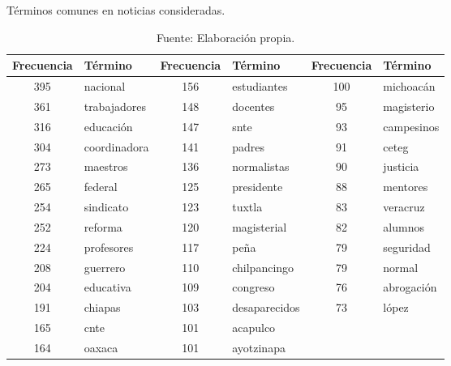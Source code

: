 \documentclass[letterpaper, 11pt]{book}
\theoremstyle{definition}
\theoremstyle{remark}
\begin{document}
\begin{table}[!hbt]
\center
\footnotesize
\caption{Términos comunes en noticias consideradas.}
\label{TerminosComunesNoticias}
\begin{tabular}{ | c | l || c | l || c | l | } 
\hline
\textbf{Frecuencia} & \textbf{Término} & \textbf{Frecuencia} & \textbf{Término} & \textbf{Frecuencia} & \textbf{Término} \\
\hline
395 &  nacional & 156 &  estudiantes & 100 &  michoacán\\ \hline
361 &  trabajadores & 148 &  docentes & 95 &  magisterio\\ \hline
316 &  educación & 147 &  snte & 93 &  campesinos\\ \hline
304 &  coordinadora & 141 &  padres & 91 &  ceteg\\ \hline
273 &  maestros & 136 &  normalistas & 90 &  justicia\\ \hline
265 &  federal & 125 &  presidente & 88 &  mentores\\ \hline
254 &  sindicato & 123 &  tuxtla & 83 &  veracruz\\ \hline
252 &  reforma & 120 &  magisterial & 82 &  alumnos\\ \hline
224 &  profesores & 117 &  peña & 79 &  seguridad\\ \hline
208 &  guerrero & 110 &  chilpancingo & 79 &  normal\\ \hline
204 &  educativa & 109 &  congreso & 76 &  abrogación\\ \hline
191 &  chiapas & 103 &  desaparecidos & 73 &  lópez\\ \hline
165 &  cnte & 101 &  acapulco &  & \\ \hline
164 &  oaxaca & 101 &  ayotzinapa &  & \\ \hline
\end{tabular}
\par\bigskip
\caption*{\small Fuente: Elaboración propia.}
\vspace{-1em}
\end{table}
\end{document}
